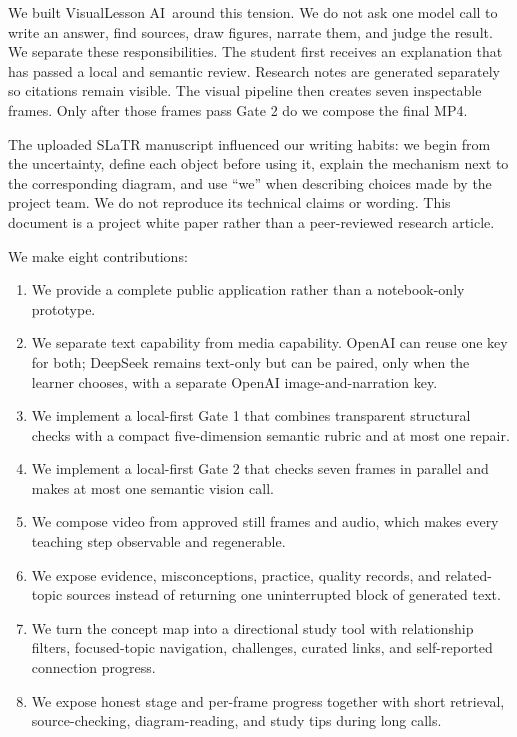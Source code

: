 \documentclass[11pt]{article}
\newcommand{\product}{VisualLesson AI}
\theoremstyle{plain}
\theoremstyle{definition}
\begin{document}
We built \product\ around this tension. We do not ask one model call to write an answer, find sources, draw figures, narrate them, and judge the result. We separate these responsibilities. The student first receives an explanation that has passed a local and semantic review. Research notes are generated separately so citations remain visible. The visual pipeline then creates seven inspectable frames. Only after those frames pass Gate 2 do we compose the final MP4.

The uploaded SLaTR manuscript influenced our writing habits: we begin from the uncertainty, define each object before using it, explain the mechanism next to the corresponding diagram, and use ``we'' when describing choices made by the project team. We do not reproduce its technical claims or wording. This document is a project white paper rather than a peer-reviewed research article.

We make eight contributions:
\begin{enumerate}
  \item We provide a complete public application rather than a notebook-only prototype.
  \item We separate text capability from media capability. OpenAI can reuse one key for both; DeepSeek remains text-only but can be paired, only when the learner chooses, with a separate OpenAI image-and-narration key.
  \item We implement a local-first Gate 1 that combines transparent structural checks with a compact five-dimension semantic rubric and at most one repair.
  \item We implement a local-first Gate 2 that checks seven frames in parallel and makes at most one semantic vision call.
  \item We compose video from approved still frames and audio, which makes every teaching step observable and regenerable.
  \item We expose evidence, misconceptions, practice, quality records, and related-topic sources instead of returning one uninterrupted block of generated text.
  \item We turn the concept map into a directional study tool with relationship filters, focused-topic navigation, challenges, curated links, and self-reported connection progress.
  \item We expose honest stage and per-frame progress together with short retrieval, source-checking, diagram-reading, and study tips during long calls.
\end{enumerate}
\end{document}
